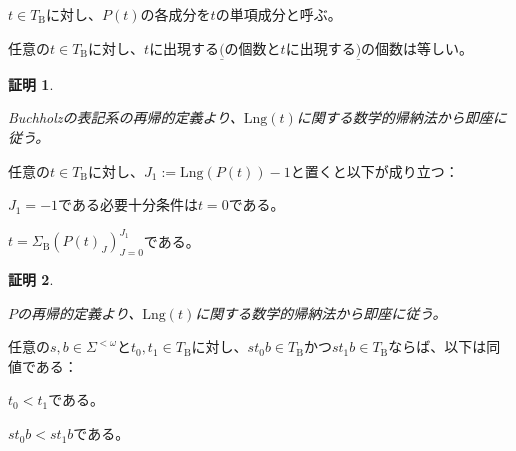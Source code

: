 \documentclass[dvipdfmx,uplatex]{jsarticle}
\theoremstyle{customnonumberbreakfortheorem}
\theoremstyle{customnonumberbreakforproof}
\newtheorem{hideableproof}{証明}
\begin{document}
\(t \in T_{\textrm{B}}\)に対し、\(P(t)\)の各成分を\(t\)の単項成分と呼ぶ。

\begin{proposition}[順序数項のカッコの個数が左右で等しいこと]\label{順序数項のカッコの個数が左右で等しいこと}
	任意の\(t \in T_{\textrm{B}}\)に対し、\(t\)に出現する\(\underline{(}\)の個数と\(t\)に出現する\(\underline{)}\)の個数は等しい。
\end{proposition}

\begin{hideableproof}
	\begin{indented}
		\item Buchholzの表記系の再帰的定義より、\(\textrm{Lng}(t)\)に関する数学的帰納法から即座に従う。
	\end{indented}
\end{hideableproof}

\begin{proposition}[順序数項の単項成分の基本性質]\label{順序数項の単項成分の基本性質}
	任意の\(t \in T_{\textrm{B}}\)に対し、\(J_1 := \textrm{Lng}(P(t))-1\)と置くと以下が成り立つ：
	\begin{penumerate}
		\item \(J_1 = -1\)である必要十分条件は\(t = 0\)である。
		\item \(t = \Sigma_{\textrm{B}} (P(t)_J)_{J=0}^{J_1}\)である。
	\end{penumerate}
\end{proposition}

\begin{hideableproof}
	\begin{indented}
		\item \(P\)の再帰的定義より、\(\textrm{Lng}(t)\)に関する数学的帰納法から即座に従う。
	\end{indented}
\end{hideableproof}

\begin{proposition}[部分表現の不等式の延長性]\label{部分表現の不等式の延長性}
	任意の\(s,b \in \Sigma^{< \omega}\)と\(t_0, t_1 \in T_{\textrm{B}}\)に対し、\(s t_0 b \in T_{\textrm{B}}\)かつ\(s t_1 b \in T_{\textrm{B}}\)ならば、以下は同値である：
	\begin{penumerate}
		\item \(t_0 < t_1\)である。
		\item \(s t_0 b < s t_1 b\)である。
	\end{penumerate}
\end{proposition}
\end{document}

